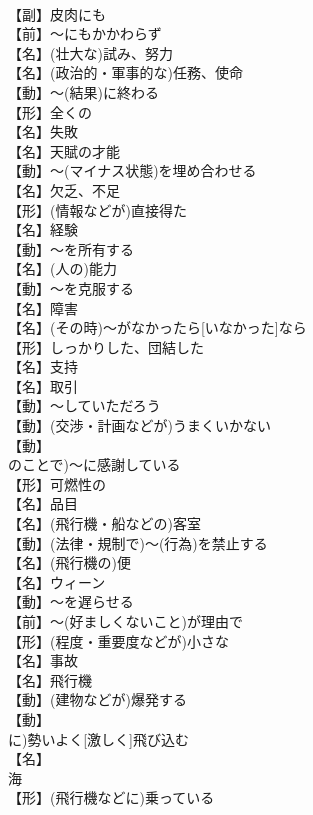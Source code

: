 \documentclass[8pt]{extreport}
\begin{document}
\begin{CJK}{UTF8}{min}
\\	【副】皮肉にも
\\	【前】～にもかかわらず
\\	【名】(壮大な)試み、努力
\\	【名】(政治的・軍事的な)任務、使命
\\	【動】～(結果)に終わる
\\	【形】全くの
\\	【名】失敗
\\	【名】天賦の才能
\\	【動】～(マイナス状態)を埋め合わせる
\\	【名】欠乏、不足
\\	【形】(情報などが)直接得た
\\	【名】経験
\\	【動】～を所有する
\\	【名】(人の)能力
\\	【動】～を克服する
\\	【名】障害
\\	【名】(その時)～がなかったら[いなかった]なら
\\	【形】しっかりした、団結した
\\	【名】支持
\\	【名】取引
\\	【動】～していただろう
\\	【動】(交渉・計画などが)うまくいかない
\\	【動】
\\	のことで)～に感謝している
\\	【形】可燃性の
\\	【名】品目
\\	【名】(飛行機・船などの)客室
\\	【動】(法律・規制で)～(行為)を禁止する
\\	【名】(飛行機の)便
\\	【名】ウィーン
\\	【動】～を遅らせる
\\	【前】～(好ましくないこと)が理由で
\\	【形】(程度・重要度などが)小さな
\\	【名】事故
\\	【名】飛行機
\\	【動】(建物などが)爆発する
\\	【動】
\\	に)勢いよく[激しく]飛び込む
\\	【名】
\\	海
\\	【形】(飛行機などに)乗っている

\end{CJK}
\end{document}
